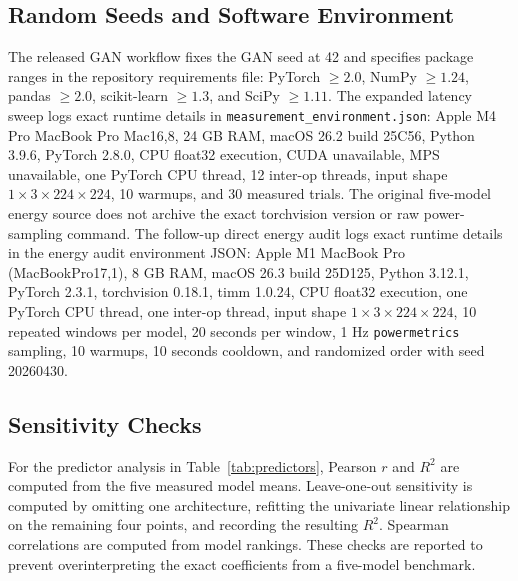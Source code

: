 \documentclass[conference]{IEEEtran}
\begin{document}
\subsection{Random Seeds and Software Environment}
The released GAN workflow fixes the GAN seed at 42 and specifies package
ranges in the repository requirements file: PyTorch $\geq 2.0$, NumPy
$\geq 1.24$, pandas $\geq 2.0$, scikit-learn $\geq 1.3$, and SciPy
$\geq 1.11$. The expanded latency sweep logs exact runtime details in
\texttt{measurement\_environment.json}: Apple M4 Pro MacBook Pro Mac16,8,
24 GB RAM, macOS 26.2 build 25C56, Python 3.9.6, PyTorch 2.8.0, CPU float32
execution, CUDA unavailable, MPS unavailable, one PyTorch CPU thread, 12
inter-op threads, input shape $1 \times 3 \times 224 \times 224$, 10 warmups,
and 30 measured trials. The original five-model energy source does not archive
the exact torchvision version or raw power-sampling command. The follow-up
direct energy audit logs exact runtime details in the energy audit environment
JSON: Apple M1 MacBook Pro (MacBookPro17,1), 8 GB RAM, macOS 26.3 build
25D125, Python 3.12.1, PyTorch 2.3.1, torchvision 0.18.1, timm 1.0.24, CPU
float32 execution, one PyTorch CPU thread, one inter-op thread, input shape
$1 \times 3 \times 224 \times 224$, 10 repeated windows per model, 20 seconds
per window, 1 Hz \texttt{powermetrics} sampling, 10 warmups, 10 seconds
cooldown, and randomized order with seed 20260430.

\subsection{Sensitivity Checks}
For the predictor analysis in Table~\ref{tab:predictors}, Pearson $r$ and
$R^2$ are computed from the five measured model means. Leave-one-out
sensitivity is computed by omitting one architecture, refitting the univariate
linear relationship on the remaining four points, and recording the resulting
$R^2$. Spearman correlations are computed from model rankings. These checks
are reported to prevent overinterpreting the exact coefficients from a
five-model benchmark.
\end{document}
